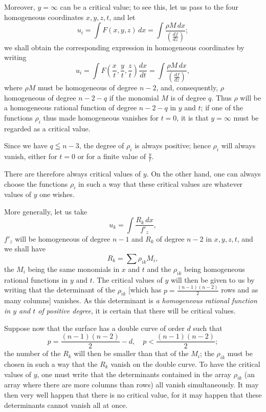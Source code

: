 \documentclass{article}
\begin{document}
Moreover, $y = \infty$ can be a critical value; to see this, let us pass to the four homogeneous coordinates $x, y, z, t$, and let
\[
u_{i} = \int F(x, y, z) \,dx = \int \frac{\rho M \,dx}{\left(\frac{df}{dz}\right)};
\]
we shall obtain the corresponding expression in homogeneous coordinates by writing
\[
u_{i} = \int F\left(\frac{x}{t}, \frac{y}{t}, \frac{z}{t}\right) \frac{dx}{dt} = \int \frac{\rho M \,dx}{\left(\frac{df}{dz}\right)},
\]
where $\rho M$ must be homogeneous of degree $n - 2$, and, consequently, $\rho$ homogeneous of degree $n - 2 - q$ if the monomial $M$ is of degree $q$. Thus $\rho$ will be a homogeneous rational function of degree $n - 2 - q$ in $y$ and $t$; if one of the functions $\rho_{i}$ thus made homogeneous vanishes for $t = 0$, it is that $y = \infty$ must be regarded as a critical value.

Since we have $q \leqq n - 3$, the degree of $\rho_{i}$ is always positive; hence $\rho_{i}$ will always vanish, either for $t = 0$ or for a finite value of $\frac{y}{t}$.

There are therefore always critical values of $y$. On the other hand, one can always choose the functions $\rho_{i}$ in such a way that these critical values are whatever values of $y$ one wishes.

More generally, let us take
\[
u_{k} = \int \frac{R_{k} \,dx}{f'_{z}},
\]
$f'_{z}$ will be homogeneous of degree $n - 1$ and $R_{k}$ of degree $n - 2$ in $x, y, z, t$, and we shall have
\[
R_{k} = \sum \rho_{ik} M_{i},
\]
the $M_{i}$ being the same monomials in $x$ and $t$ and the $\rho_{ik}$ being homogeneous rational functions in $y$ and $t$. The critical values of $y$ will then be given to us by writing that the determinant of the $\rho_{ik}$ [which has $p = \frac{(n - 1)(n - 2)}{2}$ rows and as many columns] vanishes. As this determinant is \emph{a homogeneous rational function in $y$ and $t$ of positive degree}, it is certain that there will be critical values.

Suppose now that the surface has a double curve of order $d$ such that
\[
p = \frac{(n - 1)(n - 2)}{2} - d, \quad p < \frac{(n - 1)(n - 2)}{2};
\]
the number of the $R_{k}$ will then be smaller than that of the $M_{i}$; the $\rho_{ik}$ must be chosen in such a way that the $R_{k}$ vanish on the double curve. To have the critical values of $y$, one must write that the determinants contained in the array $\rho_{ik}$ (an array where there are more columns than rows) all vanish simultaneously. It may then very well happen that there is no critical value, for it may happen that these determinants cannot vanish all at once.
\end{document}
